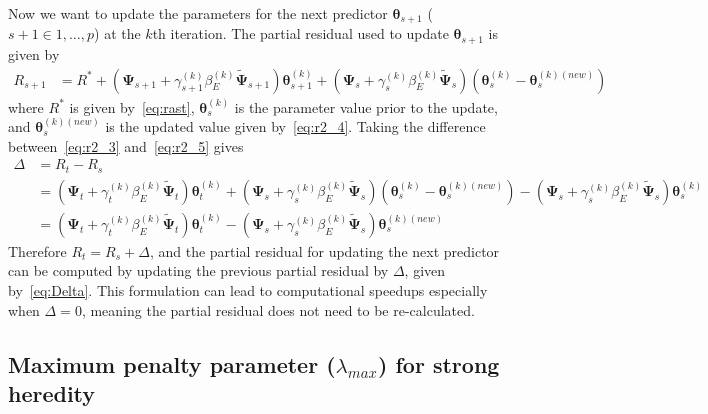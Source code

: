 \documentclass[a4paper,fleqn]{cas-sc}
\newcommand{\btheta}{\boldsymbol{\theta}}
\newcommand{\bPsi}{\boldsymbol{\Psi}}
\begin{document}
Now we want to update the parameters for the next predictor $\btheta_{s+1}$ ($s+1 \in {1,\ldots, p}$) at the $k$th iteration. The partial residual used to update $\btheta_{s+1}$ is given by
\begin{align}
R_{s+1} & = R^\ast + (\bPsi_{s+1} + \gamma_{s+1}^{(k)}\beta_E^{(k)} \widetilde{\bPsi}_{s+1})\btheta_{s+1}^{(k)} + (\bPsi_s + \gamma_s^{(k)}\beta_E^{(k)} \widetilde{\bPsi}_s)(\btheta_s^{(k)} - \btheta_s^{(k)(new)}) \label{eq:r2_5}
\end{align}
where $R^\ast$ is given by~\eqref{eq:rast}, $\btheta_s^{(k)}$ is the parameter value prior to the update, and $\btheta_s^{(k)(new)}$ is the updated value given by~\eqref{eq:r2_4}. Taking the difference between~\eqref{eq:r2_3} and~\eqref{eq:r2_5} gives
\begin{align}
\Delta & = R_t - R_s \nonumber\\
& = (\bPsi_t + \gamma_t^{(k)}\beta_E^{(k)} \widetilde{\bPsi}_t)\btheta_t^{(k)} + (\bPsi_s + \gamma_s^{(k)}\beta_E^{(k)} \widetilde{\bPsi}_s)(\btheta_s^{(k)} - \btheta_s^{(k)(new)}) - (\bPsi_s + \gamma_s^{(k)}\beta_E^{(k)} \widetilde{\bPsi}_s)\btheta_s^{(k)} \nonumber\\
& = (\bPsi_t + \gamma_t^{(k)}\beta_E^{(k)} \widetilde{\bPsi}_t)\btheta_t^{(k)} - (\bPsi_s + \gamma_s^{(k)}\beta_E^{(k)} \widetilde{\bPsi}_s)\btheta_s^{(k)(new)} \label{eq:Delta}
\end{align}
Therefore $R_t = R_s + \Delta$, and the partial residual for updating the next predictor can be computed by updating the previous partial residual by $\Delta$, given by~\eqref{eq:Delta}. This formulation can lead to computational speedups especially when $\Delta = 0$, meaning the partial residual does not need to be re-calculated.

\subsection{Maximum penalty parameter ($\lambda_{max}$) for strong heredity}
\end{document}
